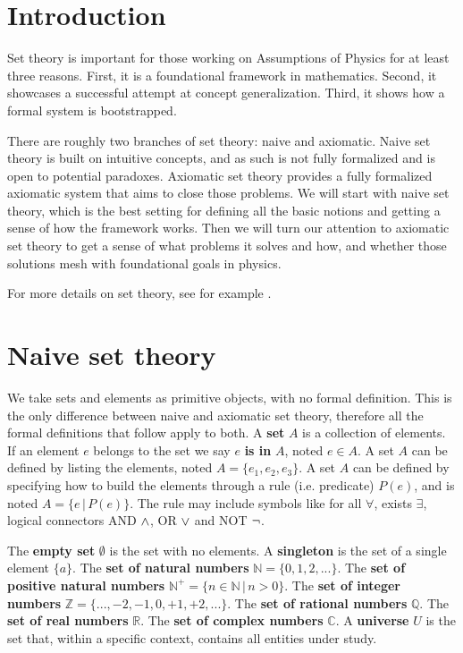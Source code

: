 \documentclass{bareminimum}
\begin{document}
\maketitle

\section{Introduction}

Set theory is important for those working on Assumptions of Physics for at least three reasons. First, it is a foundational framework in mathematics. Second, it showcases a successful attempt at concept generalization. Third, it shows how a formal system is bootstrapped.

There are roughly two branches of set theory: naive and axiomatic. Naive set theory is built on intuitive concepts, and as such is not fully formalized and is open to potential paradoxes. Axiomatic set theory provides a fully formalized axiomatic system that aims to close those problems. We will start with naive set theory, which is the best setting for defining all the basic notions and getting a sense of how the framework works. Then we will turn our attention to axiomatic set theory to get a sense of what problems it solves and how, and whether those solutions mesh with foundational goals in physics.

For more details on set theory, see for example \cite{pinter2014book}.

\section{Naive set theory}

We take sets and elements as primitive objects, with no formal definition. This is the only difference between naive and axiomatic set theory, therefore all the formal definitions that follow apply to both. A \textbf{set} $A$ is a collection of elements. If an element $e$ belongs to the set we say $e$ \textbf{is in} $A$, noted $ e 
\in A$. A set $A$ can be defined by listing the elements, noted $A = \{ e_1, e_2, e_3 \}$. A set $A$ can be defined by specifying how to build the elements through a rule (i.e. predicate) $P(e)$, and is noted $A = \{e \, | \,  P(e) \}$. The rule may include symbols like for all $\forall$, exists $\exists$, logical connectors AND $\wedge$, OR $\vee$ and NOT $\neg$.

\begin{defn}
	 The \textbf{empty set}
	  $\emptyset$ is the set with no elements. A \textbf{singleton} is the set of a single element $\{a\}$.
	 The \textbf{set of natural numbers} $\mathbb{N} = \{ 0, 1, 2, ... \}$. The \textbf{set of positive natural numbers} $\mathbb{N}^+ = \{n \in \mathbb{N} \, | \, n > 0\}$. The \textbf{set of integer numbers} $\mathbb{Z} = \{ ... , -2, -1, 0, +1, +2, ...\}$. The \textbf{set of rational numbers} $\mathbb{Q}$. The \textbf{set of real numbers} $\mathbb{R}$. The \textbf{set of complex numbers} $\mathbb{C}$. A \textbf{universe} $U$ is the set that, within a specific context, contains all entities under study.
\end{defn}
\end{document}
